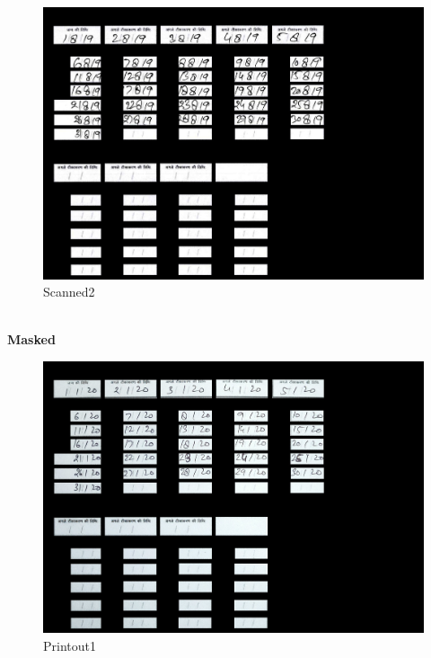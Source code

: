 \documentclass{article}
\begin{document}
    \begin{figure}[!htb]
    \minipage{\textwidth}
    \begin{center}
      \includegraphics[scale=.25]{4/.report/_segmented/_mask/s2.jpg}
      \caption{Scanned2}
    \end{center}
    \endminipage
    \end{figure}
\pagebreak\\
\textbf{Masked}
    \begin{figure}[!htb]
    \minipage{\textwidth}
    \begin{center}
      \includegraphics[scale=.25]{4/.report/_segmented/_mask/p1.jpg}
      \caption{Printout1}
    \end{center}
    \endminipage
    \end{figure}
\end{document}

